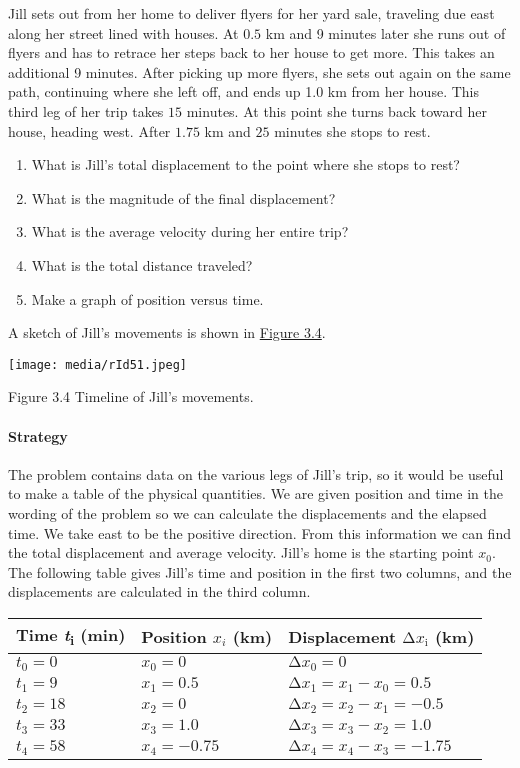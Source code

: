 Jill sets out from her home to deliver flyers for her yard sale,
traveling due east along her street lined with houses. At \(0.5\) km and
9 minutes later she runs out of flyers and has to retrace her steps back
to her house to get more. This takes an additional 9 minutes. After
picking up more flyers, she sets out again on the same path, continuing
where she left off, and ends up 1.0 km from her house. This third leg of
her trip takes \(15\) minutes. At this point she turns back toward her
house, heading west. After \(1.75\) km and \(25\) minutes she stops to
rest.

\begin{enumerate}
\def\labelenumi{\alph{enumi}.}
\item
  What is Jill's total displacement to the point where she stops to
  rest?
\item
  What is the magnitude of the final displacement?
\item
  What is the average velocity during her entire trip?
\item
  What is the total distance traveled?
\item
  Make a graph of position versus time.
\end{enumerate}

A sketch of Jill's movements is shown in
\protect\hyperlink{CNX_UPhysics_03_01_Flyers}{Figure 3.4}.

\texttt{[image: media/rId51.jpeg]}

Figure 3.4 Timeline of Jill's movements.

\hypertarget{strategy}{%
\paragraph{Strategy}\label{strategy}}

The problem contains data on the various legs of Jill's trip, so it
would be useful to make a table of the physical quantities. We are given
position and time in the wording of the problem so we can calculate the
displacements and the elapsed time. We take east to be the positive
direction. From this information we can find the total displacement and
average velocity. Jill's home is the starting point \(x_{0}\). The
following table gives Jill's time and position in the first two columns,
and the displacements are calculated in the third column.

\begin{longtable}[]{@{}lll@{}}
\toprule
Time \emph{t}\textsubscript{i} (min) & Position \(x_{i}\) (km) &
Displacement \(\mathrm{\Delta}x_{\mathrm{i}}\) (km)\tabularnewline
\midrule
\endhead
\(t_{0} = 0\) & \(x_{0} = 0\) &
\(\mathrm{\Delta}x_{0} = 0\)\tabularnewline
\(t_{1} = 9\) & \(x_{1} = 0.5\) &
\(\mathrm{\Delta}x_{1} = x_{1} - x_{0} = 0.5\)\tabularnewline
\(t_{2} = 18\) & \(x_{2} = 0\) &
\(\mathrm{\Delta}x_{2} = x_{2} - x_{1} = - 0.5\)\tabularnewline
\(t_{3} = 33\) & \(x_{3} = 1.0\) &
\(\mathrm{\Delta}x_{3} = x_{3} - x_{2} = 1.0\)\tabularnewline
\(t_{4} = 58\) & \(x_{4} = - 0.75\) &
\(\mathrm{\Delta}x_{4} = x_{4} - x_{3} = - 1.75\)\tabularnewline
\bottomrule
\end{longtable}

